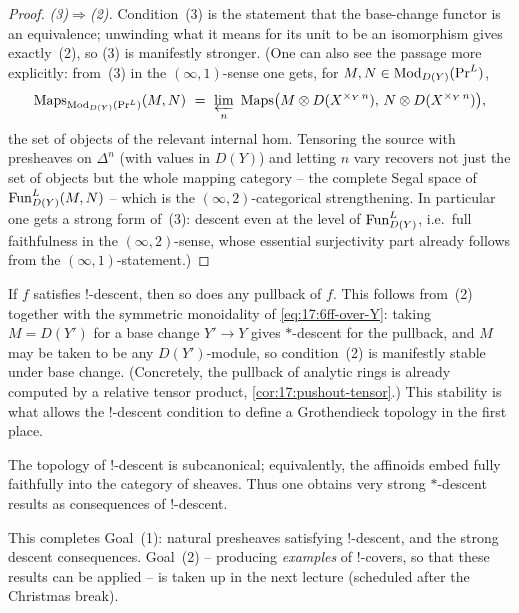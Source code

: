 \begin{proof}
\emph{(3)$\Rightarrow$(2).} Condition~(3) is the statement that the base-change functor is an
equivalence; unwinding what it means for its unit to be an isomorphism gives exactly~(2), so
(3) is manifestly stronger. (One can also see the passage more explicitly: from~(3) in the
$(\infty,1)$-sense one gets, for $M,N\in\operatorname{Mod}_{D(Y)}(\mathrm{Pr}^{L})$,
\begin{equation*}
\Maps_{\Mod_{D(Y)}(\PrL)}(M,N)\ =\ \varprojlim_{n}\ \Maps\bigl(M\otimes D(X^{\times_{Y}\,n}),\,N\otimes D(X^{\times_{Y}\,n})\bigr),
\end{equation*}
the set of objects of the relevant internal hom. Tensoring the source with presheaves on
$\Delta^{n}$ (with values in $D(Y)$) and letting $n$ vary recovers not just the set of
objects but the whole mapping category -- the complete Segal space of
$\mathrm{Fun}^{L}_{D(Y)}(M,N)$ -- which is the $(\infty,2)$-categorical strengthening. In particular one
gets a strong form of~(3): descent even at the level of $\mathrm{Fun}^{L}_{D(Y)}$, i.e.\ full
faithfulness in the $(\infty,2)$-sense, whose essential surjectivity part already follows
from the $(\infty,1)$-statement.)
\end{proof}

\begin{corollary}
\label{cor:17:descent-pullback}
If $f$ satisfies $!$-descent, then so does any pullback of $f$. This follows from~(2) together
with the symmetric monoidality of \eqref{eq:17:6ff-over-Y}: taking $M=D(Y')$ for a base change
$Y'\to Y$ gives $*$-descent for the pullback, and $M$ may be taken to be any
$D(Y')$-module, so condition~(2) is manifestly stable under base change. (Concretely, the
pullback of analytic rings is already computed by a relative tensor product,
\cref{cor:17:pushout-tensor}.) This stability is what allows the $!$-descent condition to
define a Grothendieck topology in the first place.
\end{corollary}

\begin{corollary}[Subcanonicity]
\label{cor:17:subcanonical}
The topology of $!$-descent is subcanonical; equivalently, the affinoids embed fully
faithfully into the category of sheaves. Thus one obtains very strong $*$-descent results as
consequences of $!$-descent.
\end{corollary}

\begin{remark}
\label{rmk:17:next-time}
This completes Goal~(1): natural presheaves satisfying $!$-descent, and the strong descent
consequences. Goal~(2) -- producing \emph{examples} of $!$-covers, so that these results can
be applied -- is taken up in the next lecture (scheduled after the Christmas break).
\end{remark}
